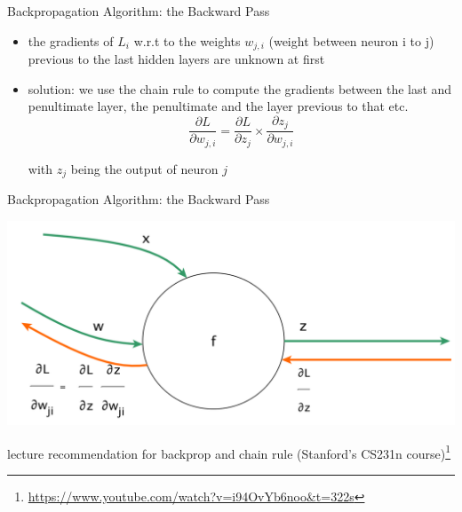 \documentclass{beamer}
\begin{document}
\begin{frame}{Backpropagation Algorithm: the Backward Pass}
\begin{itemize}
\item the gradients of $L_i$ w.r.t to the weights $w_{j,i}$ (weight between neuron i to j) previous to the last hidden layers are unknown at first
\item solution: we use the chain rule to compute the gradients between the last and penultimate layer, the penultimate and the layer previous to that etc. 
\begin{equation}
	 \frac{\partial L}{\partial w_{j,i}} = \frac{\partial L}{\partial z_j} \times \frac{\partial z_j}{\partial w_{j,i}}
\end{equation}

with $z_j$ being the output of neuron $j$ 
\end{itemize}
\end{frame}

\begin{frame}{Backpropagation Algorithm: the Backward Pass}
\begin{center}
\includegraphics[width=1\textwidth]{backprop2}
\end{center}
lecture recommendation for backprop and chain rule (Stanford's CS231n course)\footnote{\url{https://www.youtube.com/watch?v=i94OvYb6noo&t=322s}}
\end{frame}
\end{document}
